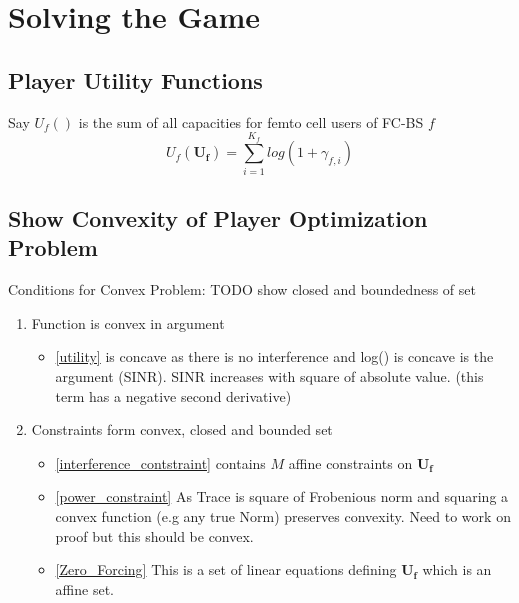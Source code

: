 \documentclass[12pt]{article}
\begin{document}
\section{Solving the Game}
\subsection{Player Utility Functions}

Say $U_f() $ is the sum of all capacities for femto cell users of FC-BS $f$ 
\begin{displaymath}
U_f(\mathbf{U_f}) = \sum^{K_f}_{i=1} log(1+\gamma_{f,i})
\end{displaymath}

\subsection{Show Convexity of Player Optimization Problem}

Conditions for Convex Problem:
TODO show closed and boundedness of set
\begin{enumerate}
\item Function is convex in argument 
\begin{itemize}
\item\eqref{utility} is concave as there is no interference and log() is concave is the argument (SINR). SINR increases with square of absolute value. (this term has a negative second derivative)

\end{itemize}

\item Constraints  form convex, closed and bounded set

\begin{itemize}

\item\eqref{interference_contstraint} contains $M$ affine constraints on $\mathbf{U_f}$

\item\eqref{power_constraint} As Trace is square of Frobenious norm and squaring a convex function (e.g any true Norm) preserves convexity.
Need to work on proof but this should be convex.

\item\eqref{Zero_Forcing} This is a set of linear equations defining $\mathbf{U_f}$ which is an affine set.

\end{itemize}
\end{enumerate}
\end{document}
